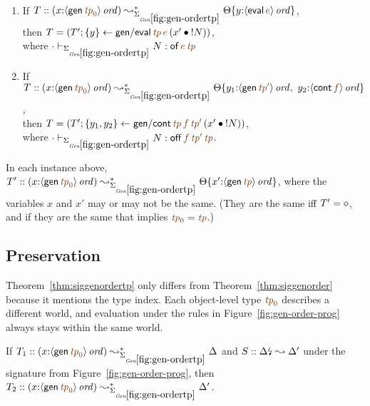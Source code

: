 \bigskip
\begin{lemma}~
\begin{enumerate}
\item If 
   $T :: (x{:}\istrue{\susp{{\sf gen}\,\lf{{\it tp}_0}}}) 
         \leadsto^*_{\siggenordertp}
         \tackon{\Theta}{y{:}\istrue{\susp{{\sf eval}\,\lf{e}}}}$,
\\ then 
   $T = \left(T'; \trstep{y}{{\sf gen/eval}\,\lf{{\it tp}}\,\lf{e}\,(\tfuser{x'}{\tbangr{N}})}\right)$,
\\ where $\cdot \vdash_{\siggenordertp} N : {\sf of}\,\lf{e}\,\lf{{\it tp}}$
\medskip
\item If 
   $T :: (x{:}\istrue{\susp{{\sf gen}\,\lf{{\it tp}_0}}})
         \leadsto^*_{\siggenordertp}
         \tackon{\Theta}{y_1{:}\istrue{\susp{{\sf gen}\,\lf{{\it tp}'}}}, ~
                         y_2{:}\istrue{\susp{{\sf cont}\,\lf{f}}}}$,
\\ then 
   $T = \left(T'; \trstep{y_1,y_2}{{\sf gen/cont}\,\lf{{\it tp}}\,\lf{f}\,\lf{{\it tp}'}\,(\tfuser{x'}{\tbangr{N}})}\right)$,
\\ where 
   $\cdot \vdash_{\siggenordertp} N : {{{\sf off}\,\lf{f}\,\lf{{\it tp}'}\,\lf{{\it tp}}}}$.
\medskip
\end{enumerate}
In each instance above, 
$T' :: (x{:}\istrue{\susp{{\sf gen}\,\lf{{\it tp}_0}}}) \leadsto^*_{\siggenordertp}
          \tackon{\Theta}{x'{:}\istrue{\susp{{\sf gen}\,\lf{{\it tp}}}}}$,
where the variables $x$ and $x'$ may or may not
be the same. (They are the same iff $T' = \diamond$, and if they
are the same that implies $\lf{{\it tp}_0} = \lf{{\it tp}}$.)
\end{lemma}
\bigskip



\subsection{Preservation}


Theorem~\ref{thm:siggenordertp} only differs from
Theorem~\ref{thm:siggenorder} because it mentions the type index.
Each object-level type $\lf{{\it tp}_0}$ describes a different world,
and evaluation under the rules in Figure~\ref{fig:gen-order-prog}
always stays within the same world.

\bigskip
\begin{theorem}
\label{thm:siggenordertp}
If $T_1 :: (x{:}\istrue{\susp{{\sf gen}\,\lf{{\it tp}_0}}}) \leadsto^*_{\siggenordertp} 
   \Delta$ and $S :: {\Delta}{\mbox{\lightning}}_{} \leadsto \Delta'$
under the signature from Figure~\ref{fig:gen-order-prog}, then
$T_2 :: (x{:}\istrue{\susp{{\sf gen}\,\lf{{\it tp}_0}}}) \leadsto^*_{\siggenordertp} 
   \Delta'$.
\end{theorem}

